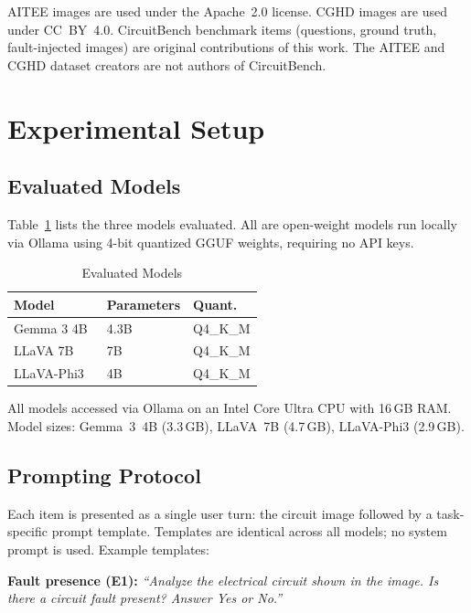 \documentclass[conference]{IEEEtran}
\begin{document}
AITEE images are used under the Apache~2.0 license.
CGHD images are used under CC~BY~4.0.
CircuitBench benchmark items (questions, ground truth, fault-injected
images) are original contributions of this work.
The AITEE and CGHD dataset creators are not authors of CircuitBench.


\section{Experimental Setup}
\label{sec:setup}

\subsection{Evaluated Models}

Table~\ref{tab:models} lists the three models evaluated.
All are open-weight models run locally via Ollama using 4-bit quantized
GGUF weights, requiring no API keys.

\begin{table}[t]
\centering
\caption{Evaluated Models}
\label{tab:models}
\begin{tabular}{lll}
\toprule
\textbf{Model} & \textbf{Parameters} & \textbf{Quant.} \\
\midrule
Gemma 3 4B~\cite{gemmateam2025gemma3}  & 4.3B & Q4\_K\_M \\
LLaVA 7B~\cite{liu2023llava}           & 7B   & Q4\_K\_M \\
LLaVA-Phi3~\cite{liu2023llava,abdin2024phi3} & 4B & Q4\_K\_M \\
\bottomrule
\end{tabular}
\vspace{2pt}

\footnotesize{All models accessed via Ollama on an Intel Core Ultra CPU
with 16\,GB RAM. Model sizes: Gemma~3~4B (3.3\,GB), LLaVA~7B (4.7\,GB),
LLaVA-Phi3 (2.9\,GB).}
\end{table}

\subsection{Prompting Protocol}

Each item is presented as a single user turn: the circuit image followed
by a task-specific prompt template.
Templates are identical across all models; no system prompt is used.
Example templates:

\textbf{Fault presence (E1):}
\textit{``Analyze the electrical circuit shown in the image.
Is there a circuit fault present? Answer Yes or No.''}
\end{document}
